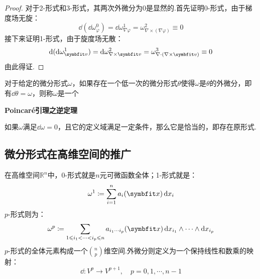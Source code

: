 \begin{proof}
    对于2-形式和3-形式，其两次外微分为$0$是显然的.首先证明0-形式，由于梯度场无旋：
    \[\dd(\dd{\omega^0_\varphi}) = \dd{\omega^1_{\nabla\varphi}} = \omega^2_{\nabla\times(\nabla\varphi)} \equiv 0\]
    接下来证明1-形式，由于旋度场无散：
    \[\dd{(\dd{\omega^1_{\vb{v}}})} = \dd{\omega^2_{\nabla\times\vb{v}}} = \omega^3_{\nabla\cdot(\nabla\times\vb{v})} \equiv 0\]
    由此得证.
\end{proof}

\begin{definition}
    对于给定的微分形式$\omega$，如果存在一个低一次的微分形式$\theta$使得$\omega$是$\theta$的外微分，即有$\dd{\theta} = \omega$，则称$\omega$是一个
\end{definition}

\begin{theorem}
    \textbf{Poincaré引理之逆定理}
    \label{thm:ConversePoincareLemma}

    如果$\omega$满足$\dd{\omega} = 0$，且它的定义域满足一定条件，那么它是恰当的，即存在原形式.
\end{theorem}


\subsection{微分形式在高维空间的推广}
在高维空间$\mathbb{R}^n$中，0-形式就是$n$元可微函数全体；1-形式就是：
\[\omega^1 \coloneq \sum_{i=1}^{n}a_i(\vb{x})\dd{x_i}\]
$p$-形式则为：
\[\omega^p \coloneq \sum_{1\leqslant i_1 < \cdots < i_p \leqslant n} a_{i_1\cdots i_p}(\vb{x})\dd{x_{i_1}}\wedge\cdots\wedge\dd{x_{i_p}}\]
$p$-形式的全体元素构成一个$\displaystyle\binom{n}{p}$维空间.外微分则定义为一个保持线性和数乘的映射：
\[\dd:V^p\to V^{p+1},\quad p = 0,1,\cdots,n-1\]
